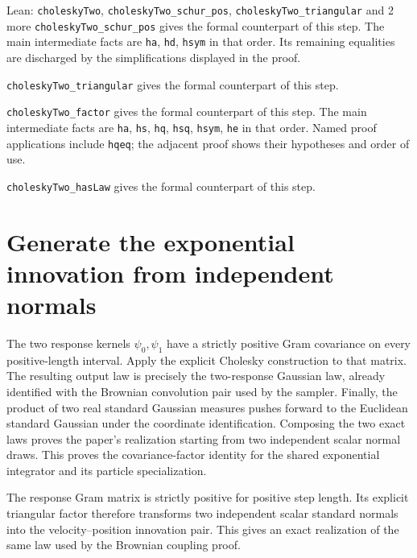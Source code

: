 \documentclass[11pt,a4paper]{article}
\begin{document}
\begin{leanbox}{Lean: \texttt{choleskyTwo}, \texttt{choleskyTwo\_\allowbreak{}schur\_\allowbreak{}pos}, \texttt{choleskyTwo\_\allowbreak{}triangular} and 2 more}
\texttt{cholesky\allowbreak{}Two\_\allowbreak{}schur\_\allowbreak{}pos} gives the formal counterpart of this step. The main intermediate facts are \texttt{ha}, \texttt{hd}, \texttt{hsym} in that order. Its remaining equalities are discharged by the simplifications displayed in the proof.




\texttt{cholesky\allowbreak{}Two\_\allowbreak{}triangular} gives the formal counterpart of this step.




\texttt{cholesky\allowbreak{}Two\_\allowbreak{}factor} gives the formal counterpart of this step. The main intermediate facts are \texttt{ha}, \texttt{hs}, \texttt{hq}, \texttt{hsq}, \texttt{hsym}, \texttt{he} in that order. Named proof applications include \texttt{hqeq}; the adjacent proof shows their hypotheses and order of use.




\texttt{cholesky\allowbreak{}Two\_\allowbreak{}has\allowbreak{}Law} gives the formal counterpart of this step.
\end{leanbox}

\section{\texorpdfstring{Generate the exponential innovation from independent normals}{Generate the exponential innovation from independent normals}}


The two response kernels \(\psi_0,\psi_1\) have a strictly positive Gram covariance on every positive-length interval. Apply the explicit Cholesky construction to that matrix. The resulting output law is precisely the two-response Gaussian law, already identified with the Brownian convolution pair used by the sampler. Finally, the product of two real standard Gaussian measures pushes forward to the Euclidean standard Gaussian under the coordinate identification. Composing the two exact laws proves the paper’s realization starting from two independent scalar normal draws. This proves the covariance-factor identity for the shared exponential integrator and its particle specialization.



The response Gram matrix is strictly positive for positive step length. Its explicit triangular factor therefore transforms two independent scalar standard normals into the velocity–position innovation pair. This gives an exact realization of the same law used by the Brownian coupling proof.
\end{document}

